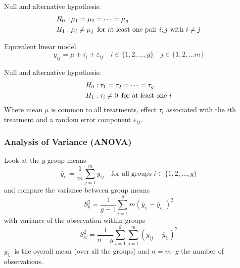 \documentclass[11pt]{article}
\theoremstyle{definition}
\newcommand*\samplemean[1]{\overline{#1}}
\begin{document}
\vspace{1em}
\noindent
Null and alternative hypothesis:
\begin{align*}
	H_0 &: \mu_1 = \mu_2 = \dots = \mu_g\\
	H_1 &: \mu_i \neq \mu_j\hspace*{0.5em}\text{for at least one pair $i,j$ with $i\neq j$}
\end{align*}

\vspace{1em}
\noindent
Equivalent linear model
\begin{equation*}
	y_{ij} = \mu + \tau_i + \varepsilon_{ij}\quad i\in\{1,2,\dots,g\}\quad j\in\{1,2,\dots m\}
\end{equation*}

\vspace{1em}
\noindent
Null and alternative hypothesis:
\begin{align*}
	H_0 &: \tau_1 = \tau_2 = \dots = \tau_g\\
	H_1 &: \tau_i \neq 0\hspace*{0.5em}\text{for at least one $i$}
\end{align*}
Where mean $\mu$ is common to all treatments, effect $\tau_i$ associated with the $i$th treatment and a random error component $\varepsilon_{ij}$.

\subsubsection{Analysis of Variance (ANOVA)}
Look at the $g$ group means
\begin{equation*}
	\samplemean{y}_{i.} = \frac{1}{m}\sum_{j=1}^{m}y_{ij}\quad\text{for all groups $i\in\{1,2,\dots,g\}$}
\end{equation*}
and compare the variance between group means
\begin{equation*}
	S_b^2 = \frac{1}{g-1}\sum_{i=1}^{g}m\left(\samplemean{y}_{i.} - \samplemean{y}_{i..}\right)^2
\end{equation*}
with variance of the observation within groups
\begin{equation*}
	S_w^2 = \frac{1}{n-g}\sum_{i=1}^{g}\sum_{j=1}^{m}\left(y_{ij} - \samplemean{y}_{i.}\right)^2
\end{equation*}
$\samplemean{y}_{i..}$ is the overall mean (over all the groups) and $n=m\cdot g$ the number of observations.
\end{document}
